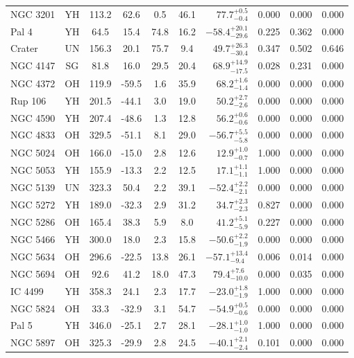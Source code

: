 \begin{tabular}{lcccccrccc}
	NGC 3201 & YH & 113.2 & 62.6 & 0.5 & 46.1 & $77.7^{+0.5}_{-0.4}$ & 0.000 & 0.000 & 0.000 \\
	Pal 4 & YH & 64.5 & 15.4 & 74.8 & 16.2 & $-58.4^{+20.1}_{-29.6}$ & 0.225 & 0.362 & 0.000 \\
	Crater & UN & 156.3 & 20.1 & 75.7 & 9.4 & $49.7^{+26.3}_{-30.4}$ & 0.347 & 0.502 & 0.646 \\
	NGC 4147 & SG & 81.8 & 16.0 & 29.5 & 20.4 & $68.9^{+14.9}_{-17.5}$ & 0.028 & 0.231 & 0.000 \\
	NGC 4372 & OH & 119.9 & -59.5 & 1.6 & 35.9 & $68.2^{+1.6}_{-1.4}$ & 0.000 & 0.000 & 0.000 \\
	Rup 106 & YH & 201.5 & -44.1 & 3.0 & 19.0 & $50.2^{+2.7}_{-2.6}$ & 0.000 & 0.000 & 0.000 \\
	NGC 4590 & YH & 207.4 & -48.6 & 1.3 & 12.8 & $56.2^{+0.6}_{-0.6}$ & 0.000 & 0.000 & 0.000 \\
	NGC 4833 & OH & 329.5 & -51.1 & 8.1 & 29.0 & $-56.7^{+5.5}_{-5.8}$ & 0.000 & 0.000 & 0.000 \\
	NGC 5024 & OH & 166.0 & -15.0 & 2.8 & 12.6 & $12.9^{+1.0}_{-0.7}$ & 1.000 & 0.000 & 0.000 \\
	NGC 5053 & YH & 155.9 & -13.3 & 2.2 & 12.5 & $17.1^{+1.1}_{-1.1}$ & 1.000 & 0.000 & 0.000 \\
	NGC 5139 & UN & 323.3 & 50.4 & 2.2 & 39.1 & $-52.4^{+2.2}_{-2.1}$ & 0.000 & 0.000 & 0.000 \\
	NGC 5272 & YH & 189.0 & -32.3 & 2.9 & 31.2 & $34.7^{+2.3}_{-2.3}$ & 0.827 & 0.000 & 0.000 \\
	NGC 5286 & OH & 165.4 & 38.3 & 5.9 & 8.0 & $41.2^{+5.1}_{-5.9}$ & 0.227 & 0.000 & 0.000 \\
	NGC 5466 & YH & 300.0 & 18.0 & 2.3 & 15.8 & $-50.6^{+2.2}_{-1.9}$ & 0.000 & 0.000 & 0.000 \\
	NGC 5634 & OH & 296.6 & -22.5 & 13.8 & 26.1 & $-57.1^{+13.4}_{-9.4}$ & 0.006 & 0.014 & 0.000 \\
	NGC 5694 & OH & 92.6 & 41.2 & 18.0 & 47.3 & $79.4^{+7.6}_{-10.0}$ & 0.000 & 0.035 & 0.000 \\
	IC 4499 & YH & 358.3 & 24.1 & 2.3 & 17.7 & $-23.0^{+1.8}_{-1.9}$ & 1.000 & 0.000 & 0.000 \\
	NGC 5824 & OH & 33.3 & -32.9 & 3.1 & 54.7 & $-54.9^{+0.5}_{-0.6}$ & 0.000 & 0.000 & 0.000 \\
	Pal 5 & YH & 346.0 & -25.1 & 2.7 & 28.1 & $-28.1^{+1.0}_{-1.0}$ & 1.000 & 0.000 & 0.000 \\
	NGC 5897 & OH & 325.3 & -29.9 & 2.8 & 24.5 & $-40.1^{+2.1}_{-2.4}$ & 0.101 & 0.000 & 0.000 \\

\end{tabular}
